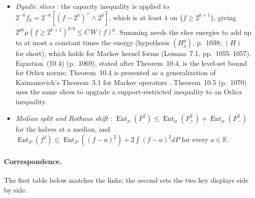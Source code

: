 \documentclass[11pt]{article}
\newcommand{\R}{\mathbb{R}}
\DeclareMathOperator{\Ent}{Ent}
\newcommand{\sloc}[2]{\cite[#2]{#1}}
\begin{document}
\begin{itemize}
 plus Remark~19 (which derives the needed Poincar\'e inequality from capacity),
 gives: $\mu(A)\log(2/\mu(A))\lesssim\mathrm{Cap}_\mu(A)$ implies the
 log-Sobolev inequality.
\item \emph{Dyadic slices}
 \sloc{BakryEtAl1995-SobolevInequalitiesInDisguise}{\S10.1, p.~1065}: the
 capacity inequality is applied to $2^{-k}f_k=2^{-k}[(f-2^k)^+\wedge2^k]$, which
 is at least $1$ on $\{f\ge2^{k+1}\}$, giving
 $2^{pk}\mu(f\ge2^{k+1})^{p/q}\le C\,W(f)^p$. Summing needs the slice energies to
 add up to at most a constant times the energy (hypothesis $(H^p_\rho)$,
 p.~1038; $(H)$ for short), which holds for Markov kernel forms (Lemma~7.1,
 pp.~1055--1057). Equation~(10.4) (p.~1069), stated after Theorem~10.4, is the
 level-set bound for Orlicz norms; Theorem~10.4 is presented as a
 generalization of Kaimanovich's Theorem~3.1 for Markov operators
 \cite{NL-Kaimanovich1992}. Theorem~10.5 (p.~1070) uses the same slices to
 upgrade a support-restricted inequality to an Orlicz inequality.
\item \emph{Median split and Rothaus shift}
 \sloc{BartheRoberto2003-SobolevInequalitiesRealLine}{Lemma~4, p.~485; proof of
 Thm~3, pp.~486--487}: $\Ent_\mu(F^2)\le\Ent_\mu(F_+^2)+\Ent_\mu(F_-^2)$ for the
 halves at a median, and
 $\Ent_P(f^2)\le\Ent_P((f-a)^2)+2\int(f-a)^2dP$ for every $a\in\R$.
\end{itemize}

\paragraph{Correspondence.}
The first table below matches the links; the second sets the two key displays
side by side.
\end{document}
